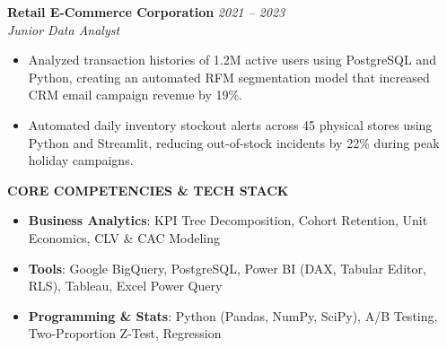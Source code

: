 \begin{samplecvbox}
\textbf{Retail E-Commerce Corporation} \hfill \textit{2021 -- 2023}\\
\textit{Junior Data Analyst}
\begin{itemize}[leftmargin=12pt, nosep]
    \item Analyzed transaction histories of 1.2M active users using PostgreSQL and Python, creating an automated RFM segmentation model that increased CRM email campaign revenue by 19\%.
    \item Automated daily inventory stockout alerts across 45 physical stores using Python and Streamlit, reducing out-of-stock incidents by 22\% during peak holiday campaigns.
\end{itemize}\vspace{6pt}

\textbf{\large CORE COMPETENCIES \& TECH STACK}
\begin{itemize}[leftmargin=12pt, nosep]
    \item \textbf{Business Analytics}: KPI Tree Decomposition, Cohort Retention, Unit Economics, CLV \& CAC Modeling
    \item \textbf{Tools}: Google BigQuery, PostgreSQL, Power BI (DAX, Tabular Editor, RLS), Tableau, Excel Power Query
    \item \textbf{Programming \& Stats}: Python (Pandas, NumPy, SciPy), A/B Testing, Two-Proportion Z-Test, Regression
\end{itemize}
\end{samplecvbox}

